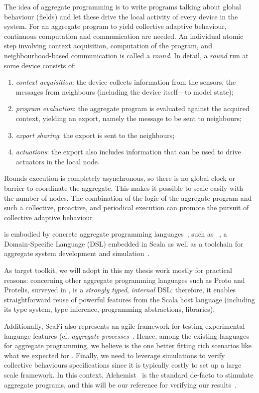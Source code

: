 \documentclass[11pt]{article}
\begin{document}
The idea of aggregate programming is to write programs talking about global behaviour (fields) and let these drive the local activity of every device in the system.
%
For an aggregate program to yield collective adaptive behaviour, continuous computation and communication are needed.
%
An individual atomic step involving context acquisition, computation of the program, and neighbourhood-based communication is called a \emph{round}.
%
In detail, a \emph{round} run at some device consists of:
\begin{enumerate}
  \item \emph{context acquisition}: the device collects information from the sensors, the messages from neighbours (including the device itself---to model state);
  \item \emph{program evaluation}: the aggregate program is evaluated against the acquired context, yielding an export, namely the message to be sent to neighbours;
  \item \emph{export sharing}: the export is sent to the neighbours;
  \item \emph{actuations}: the export also includes information that can be used to drive actuators in the local node.
\end{enumerate}

Rounds execution is completely asynchronous, so there is no global clock or barrier to coordinate the aggregate. This makes it possible to scale easily with the number of nodes. 
%
The combination of the logic of the aggregate program and such a collective, proactive, and periodical execution can promote the pursuit of collective adaptive behaviour

\ac{} is embodied by concrete aggregate programming languages~\cite{viroli2019jlamp-si-coord},
 such as \scafi{}~\cite{DBLP:conf/isola/CasadeiVAD20,DBLP:journals/eaai/CasadeiVAPD21},
 a Domain-Specific Language (DSL) embedded in Scala
 as well as a toolchain for aggregate system development and simulation~\cite{Casadei2016mass}.
%

As target toolkit, we will adopt \scafi{} in this my thesis work mostly for practical reasons: concerning other aggregate programming languages such as Proto and Protelis, surveyed in \cite{viroli2019jlamp-si-coord},
\scafi{} is a \emph{strongly typed}, \emph{internal} DSL; therefore, it enables straightforward reuse of powerful features from the Scala host language (including its type system, type inference, programming abstractions, libraries).

Additionally, ScaFi also represents an agile framework for testing experimental language features (cf. \emph{aggregate processes}~\cite{DBLP:journals/eaai/CasadeiVAPD21}.
%
Hence, among the existing languages for aggregate programming, we believe \scafi{} is the one better fitting rich scenarios like what we expected for \cpsw{}.
%
Finally, we need to leverage simulations to verify collective behaviours specifications since it is typically costly to set up a large scale framework. In this context, Alchemist~\cite{} is the standard de-facto to stimulate aggregate programs, and this will be our reference for verifying our results~\cite{Pianini_2013}.
\end{document}
